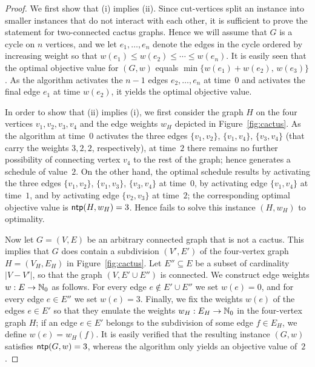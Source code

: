 \begin{proof}
We first show that (i) implies (ii).
Since cut-vertices split an {\xxxNTP} instance into smaller instances that do not interact 
with each other, it is sufficient to prove the statement for two-connected cactus graphs.
Hence we will assume that $G$ is a cycle on $n$ vertices, and we let $e_1,\ldots,e_n$ 
denote the edges in the cycle ordered by increasing weight so that 
$w(e_1)\le w(e_2)\le\cdots\le w(e_n)$.
It is easily seen that the optimal objective value for $(G,w)$ equals 
$\min\{w(e_1)+w(e_2),\,w(e_3)\}$.
As the {\greedy} algorithm activates the $n-1$ edges $e_2,\ldots,e_n$ at time~$0$ and 
activates the final edge $e_1$ at time $w(e_2)$, it yields the optimal objective value.

In order to show that (ii) implies (i), we first consider the graph $H$ on the four
vertices $v_1,v_2,v_3,v_4$ and the edge weights $w_H$ depicted in Figure~\ref{fig:cactus}.
As the {\greedy} algorithm at time~$0$ activates the three edges $\{v_1,v_2\}$, $\{v_1,v_4\}$, 
$\{v_3,v_4\}$ (that carry the weights $3,2,2$, respectively), at time~$2$ there remains no 
further possibility of connecting vertex $v_4$ to the rest of the graph; hence {\greedy} 
generates a schedule of value~$2$.
On the other hand, the optimal schedule results by activating the three edges $\{v_1,v_2\}$, 
$\{v_1,v_3\}$, $\{v_3,v_4\}$ at time~$0$, by activating edge $\{v_1,v_4\}$ at time~$1$,
and by activating edge $\{v_2,v_3\}$ at time~$2$; the corresponding optimal objective
value is $\operatorname{\textsf{ntp}}(H,w_H)=3$.
Hence {\greedy} fails to solve this instance $(H,w_H)$ to optimality.

Now let $G=(V,E)$ be an arbitrary connected graph that is not a cactus. 
This implies that $G$ does contain a subdivision $(V',E')$ of the four-vertex 
graph $H=(V_H,E_H)$ in Figure~\ref{fig:cactus}.
Let $E''\subseteq E$ be a subset of cardinality $|V-V'|$, so that the graph $(V,E'\cup E'')$
is connected.
We construct edge weights $w:E\to\mathbb{N}_0$ as follows.
For every edge $e\notin E'\cup E''$ we set $w(e)=0$, and
for every edge $e\in E''$ we set $w(e)=3$.
Finally, we fix the weights $w(e)$ of the edges $e\in E'$ so that they emulate the 
weights $w_H:E_H\to\mathbb{N}_0$ in the four-vertex graph $H$; if an edge $e\in E'$ belongs to the 
subdivision of some edge $f\in E_H$, we define $w(e)=w_H(f)$.
It is easily verified that the resulting instance $(G,w)$ satisfies $\operatorname{\textsf{ntp}}(G,w)=3$,
whereas the {\greedy} algorithm only yields an objective value of~$2$.
\end{proof}


